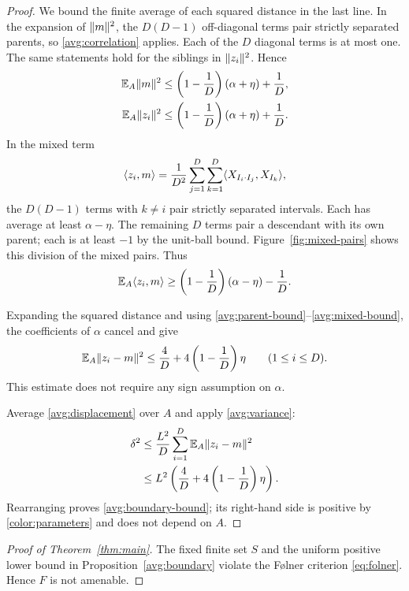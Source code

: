 \begin{proof}
We bound the finite average of each squared distance in the last
line.  In the expansion of $\lVert m\rVert^2$, the $D(D-1)$
off-diagonal terms pair strictly separated parents, so
\eqref{avg:correlation} applies.  Each of the $D$ diagonal terms
is at most one.  The same statements hold for the siblings in
$\lVert z_i\rVert^2$.  Hence
\begin{align}
  \mathbb E_A\lVert m\rVert^2
       &\leq\left(1-\frac1D\right)(\alpha+\eta)+\frac1D,
       \label{avg:parent-bound}\\
  \mathbb E_A\lVert z_i\rVert^2
       &\leq\left(1-\frac1D\right)(\alpha+\eta)+\frac1D.
       \label{avg:child-bound}
\end{align}
In the mixed term
\[
  \langle z_i,m\rangle
    =\frac1{D^2}\sum_{j=1}^D\sum_{k=1}^D
                  \langle X_{I_i\cdot I_j},X_{I_k}\rangle,
\]
the $D(D-1)$ terms with $k\ne i$ pair strictly separated
intervals.  Each has average at least $\alpha-\eta$.
The remaining $D$ terms pair a descendant with its own parent;
each is at least $-1$ by the unit-ball bound.  Figure~\ref{fig:mixed-pairs}
shows this division of the mixed pairs.  Thus
\begin{equation}\label{avg:mixed-bound}
  \mathbb E_A\langle z_i,m\rangle
    \geq\left(1-\frac1D\right)(\alpha-\eta)-\frac1D.
\end{equation}

Expanding the squared distance and using
\eqref{avg:parent-bound}--\eqref{avg:mixed-bound}, the coefficients
of $\alpha$ cancel and give
\begin{equation}\label{avg:variance}
  \mathbb E_A\lVert z_i-m\rVert^2
    \leq\frac4D+4\left(1-\frac1D\right)\eta
    \qquad(1\leq i\leq D).
\end{equation}
This estimate does not require any sign assumption on $\alpha$.

Average \eqref{avg:displacement} over $A$ and apply
\eqref{avg:variance}:
\begin{align*}
  \delta^2
  &\leq\frac{L^2}{D}\sum_{i=1}^D
                 \mathbb E_A\lVert z_i-m\rVert^2\\
  &\leq L^2\left(\frac4D+4\left(1-\frac1D\right)\eta\right).
\end{align*}
Rearranging proves \eqref{avg:boundary-bound}; its right-hand side is
positive by \eqref{color:parameters} and does not depend on $A$.
\end{proof}

\begin{proof}[Proof of Theorem~\ref{thm:main}]
The fixed finite set $S$ and the uniform positive lower bound in
Proposition~\ref{avg:boundary} violate the F\o lner criterion
\eqref{eq:folner}.  Hence $F$ is not amenable.
\end{proof}
